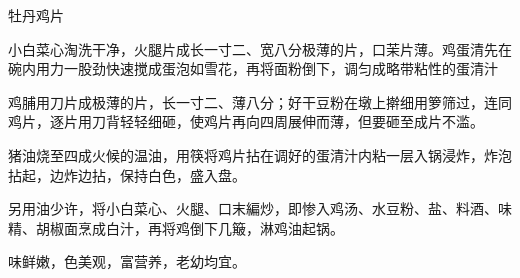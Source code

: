 \begin{recipe}{牡丹鸡片}

\ingredients


\preparation

\step 小白菜心淘洗干净，火腿片成长一寸二、宽八分极薄的片，口茉片薄。鸡蛋清先在
碗内用力一股劲快速搅成蛋泡如雪花，再将面粉倒下，调匀成略带粘性的蛋清汁

\step 鸡脯用刀片成极薄的片，长一寸二、薄八分；好干豆粉在墩上擀细用箩筛过，连同
鸡片，逐片用刀背轻轻细砸，使鸡片再向四周展伸而薄，但要砸至成片不滥。

\step 猪油烧至四成火候的温油，用筷将鸡片拈在调好的蛋清汁内粘一层入锅浸炸，炸泡
拈起，边炸边拈，保持白色，盛入盘。

\step 另用油少许，将小白菜心、火腿、口末編炒，即惨入鸡汤、水豆粉、盐、料酒、味
精、胡椒面烹成白汁，再将鸡倒下几簸，淋鸡油起锅。

\features

味鲜嫩，色美观，富营养，老幼均宜。

\end{recipe}

